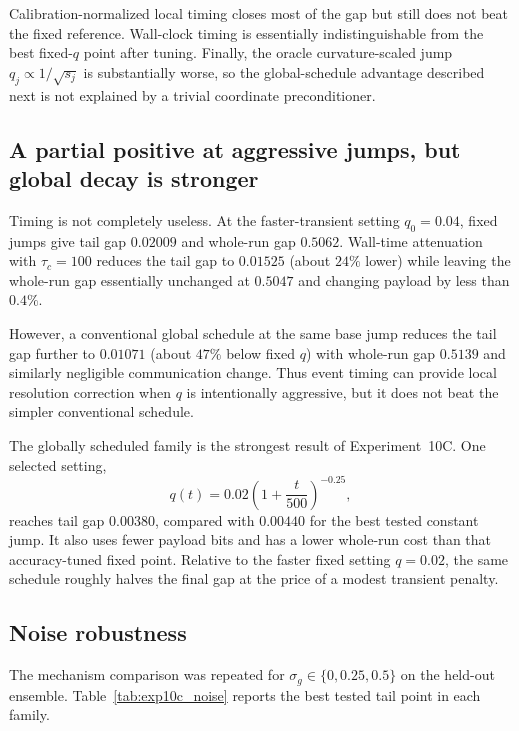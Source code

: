Calibration-normalized local timing closes most of the gap but still does not beat the fixed reference. Wall-clock timing is essentially indistinguishable from the best fixed-$q$ point after tuning. Finally, the oracle curvature-scaled jump $q_j\propto1/\sqrt{s_j}$ is substantially worse, so the global-schedule advantage described next is not explained by a trivial coordinate preconditioner.

\subsection{A partial positive at aggressive jumps, but global decay is stronger}

Timing is not completely useless. At the faster-transient setting $q_0=0.04$, fixed jumps give tail gap $0.02009$ and whole-run gap $0.5062$. Wall-time attenuation with $\tau_c=100$ reduces the tail gap to $0.01525$ (about $24\%$ lower) while leaving the whole-run gap essentially unchanged at $0.5047$ and changing payload by less than $0.4\%$.

However, a conventional global schedule at the same base jump reduces the tail gap further to $0.01071$ (about $47\%$ below fixed $q$) with whole-run gap $0.5139$ and similarly negligible communication change. Thus event timing can provide local resolution correction when $q$ is intentionally aggressive, but it does not beat the simpler conventional schedule.

The globally scheduled family is the strongest result of Experiment~10C. One selected setting,
\begin{equation}
  q(t)=0.02\left(1+\frac{t}{500}\right)^{-0.25},
\end{equation}
reaches tail gap $0.00380$, compared with $0.00440$ for the best tested constant jump. It also uses fewer payload bits and has a lower whole-run cost than that accuracy-tuned fixed point. Relative to the faster fixed setting $q=0.02$, the same schedule roughly halves the final gap at the price of a modest transient penalty.

\subsection{Noise robustness}

The mechanism comparison was repeated for $\sigma_g\in\{0,0.25,0.5\}$ on the held-out ensemble. Table~\ref{tab:exp10c_noise} reports the best tested tail point in each family.

